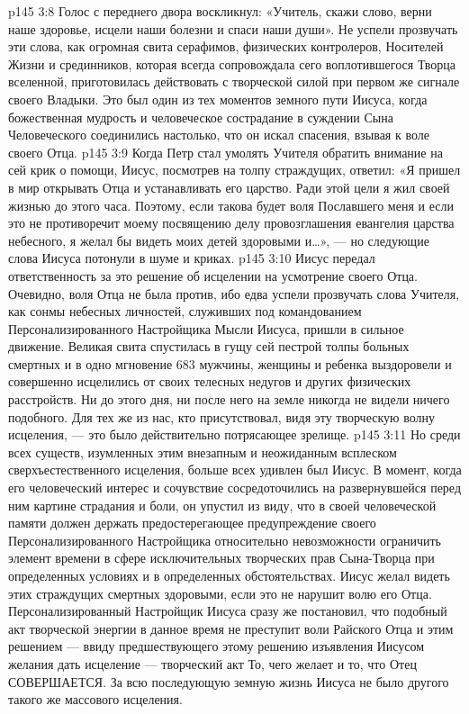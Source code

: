\vs p145 3:8 Голос с переднего двора воскликнул: «Учитель, скажи слово, верни наше здоровье, исцели наши болезни и спаси наши души». Не успели прозвучать эти слова, как огромная свита серафимов, физических контролеров, Носителей Жизни и срединников, которая всегда сопровождала сего воплотившегося Творца вселенной, приготовилась действовать с творческой силой при первом же сигнале своего Владыки. Это был один из тех моментов земного пути Иисуса, когда божественная мудрость и человеческое сострадание в суждении Сына Человеческого соединились настолько, что он искал спасения, взывая к воле своего Отца.
\vs p145 3:9 Когда Петр стал умолять Учителя обратить внимание на сей крик о помощи, Иисус, посмотрев на толпу страждущих, ответил: «Я пришел в мир открывать Отца и устанавливать его царство. Ради этой цели я жил своей жизнью до этого часа. Поэтому, если такова будет воля Пославшего меня и если это не противоречит моему посвящению делу провозглашения евангелия царства небесного, я желал бы видеть моих детей здоровыми и\ldots », --- но следующие слова Иисуса потонули в шуме и криках.
\vs p145 3:10 Иисус передал ответственность за это решение об исцелении на усмотрение своего Отца. Очевидно, воля Отца не была против, ибо едва успели прозвучать слова Учителя, как сонмы небесных личностей, служивших под командованием Персонализированного Настройщика Мысли Иисуса, пришли в сильное движение. Великая свита спустилась в гущу сей пестрой толпы больных смертных и в одно мгновение 683 мужчины, женщины и ребенка выздоровели и совершенно исцелились от своих телесных недугов и других физических расстройств. Ни до этого дня, ни после него на земле никогда не видели ничего подобного. Для тех же из нас, кто присутствовал, видя эту творческую волну исцеления, --- это было действительно потрясающее зрелище.
\vs p145 3:11 \pc Но среди всех существ, изумленных этим внезапным и неожиданным всплеском сверхъестественного исцеления, больше всех удивлен был Иисус. В момент, когда его человеческий интерес и сочувствие сосредоточились на развернувшейся перед ним картине страдания и боли, он упустил из виду, что в своей человеческой памяти должен держать предостерегающее предупреждение своего Персонализированного Настройщика относительно невозможности ограничить элемент времени в сфере исключительных творческих прав Сына\hyp{}Творца при определенных условиях и в определенных обстоятельствах. Иисус желал видеть этих страждущих смертных здоровыми, если это не нарушит волю его Отца. Персонализированный Настройщик Иисуса сразу же постановил, что подобный акт творческой энергии в данное время не преступит воли Райского Отца и этим решением --- ввиду предшествующего этому решению изъявления Иисусом желания дать исцеление --- творческий акт  То, чего желает  и то, что Отец  СОВЕРШАЕТСЯ. За всю последующую земную жизнь Иисуса не было другого такого же массового исцеления.
